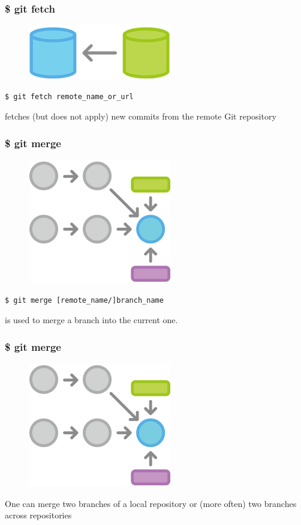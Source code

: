 \documentclass{beamer}
\begin{document}
\begin{frame}[fragile]
    \frametitle{\$ git fetch}
    \begin{figure}[h!]
        \begin{center}
            \includegraphics[scale=0.7]{pull.png}
        \end{center}
    \end{figure}
    \begin{verbatim}
$ git fetch remote_name_or_url
    \end{verbatim}
    fetches (but does not apply) new commits from the remote Git repository
\end{frame}

\begin{frame}[fragile]
    \frametitle{\$ git merge}
    \begin{figure}[h!]
        \begin{center}
            \includegraphics[scale=0.6]{merge.png}
        \end{center}
    \end{figure}
    \begin{verbatim}
$ git merge [remote_name/]branch_name
    \end{verbatim}
    is used to merge a branch into the current one.
\end{frame}

\begin{frame}
    \frametitle{\$ git merge}
    \begin{figure}[h!]
        \begin{center}
            \includegraphics[scale=0.6]{merge.png}
        \end{center}
    \end{figure}
    One can merge two branches of a local repository or (more often)
    two branches across repositories
\end{frame}
\end{document}

